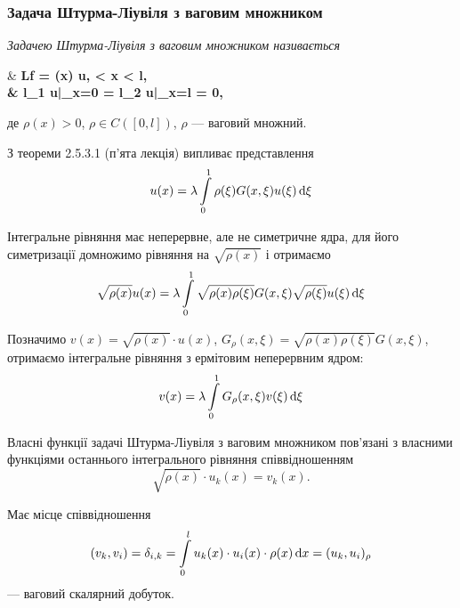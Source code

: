 \subsubsection{Задача Штурма-Ліувіля з ваговим множником}

\begin{definition}
	\it{Задачею Штурма-Ліувіля з ваговим множником} називається
	\begin{system}
		& \bf{L}f = \lambda \rho(x) u,  < x < l, \\
		& l_1 u|_{x=0} = l_2 u|_{x=l} = 0,
	\end{system}
	де $\rho(x) > 0$, $\rho \in C([0, l])$, $\rho$ --- ваговий множний.
\end{definition}

З теореми 2.5.3.1 (п'ята лекція) %
випливає представлення
\begin{equation}
	u(x) = \lambda \displaystyle\int\limits_0^1 \rho(\xi) G(x, \xi) u(\xi) \mathop{}\!\mathrm{d} \xi
\end{equation}

Інтегральне рівняння має неперервне, але не симетричне ядра, для його симетризації домножимо рівняння на $\sqrt{\rho(x)}$ і отримаємо
\begin{equation}
	\sqrt{\rho(x)}u(x) = \lambda \displaystyle\int\limits_0^1 \sqrt{\rho(x)\rho(\xi)} G(x, \xi)\sqrt{ \rho(\xi)}u(\xi) \mathop{}\!\mathrm{d} \xi
\end{equation}

Позначимо $v(x) = \sqrt{\rho(x)} \cdot u(x)$, $G_\rho(x, \xi) = \sqrt{\rho(x)\rho(\xi)} G(x, \xi)$, отримаємо інтегральне рівняння з ермітовим неперервним ядром:
\begin{equation}
	v(x) = \lambda \displaystyle\int\limits_0^1 G_\rho(x, \xi) v(\xi) \mathop{}\!\mathrm{d} \xi
\end{equation}

Власні функції задачі Штурма-Ліувіля з ваговим множником пов'язані з власними функціями останнього інтегрального рівняння співвідношенням
\begin{equation}
	\sqrt{\rho(x)} \cdot u_k(x) = v_k(x).
\end{equation}

\begin{proposition}
	Має місце співвідношення 
	\begin{equation}
		(v_k, v_i) = \delta_{i,k} = \displaystyle\int\limits_0^l u_k(x) \cdot u_i(x) \cdot \rho(x) \mathop{}\!\mathrm{d} x = (u_k, u_i)_\rho
	\end{equation}
	--- ваговий скалярний добуток.
\end{proposition}

